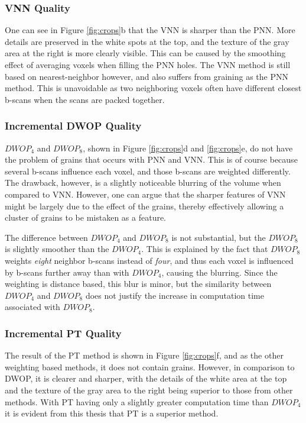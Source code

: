 	\subsubsection{VNN Quality}
	
		One can see in Figure \ref{fig:crops}b that the VNN is sharper than the PNN. More details are preserved in the white spots at the top, and the texture of the gray area at the right is more clearly visible. This can be caused by the smoothing effect of averaging voxels when filling the PNN holes. The VNN method is still based on nearest-neighbor however, and also suffers from graining as the PNN method. This is unavoidable as two neighboring voxels often have different closest b-scans when the scans are packed together.
	
	\subsubsection{Incremental DWOP Quality} %
	
		$DWOP_4$ and $DWOP_8$, shown in Figure \ref{fig:crops}d and \ref{fig:crops}e, do not have the problem of grains that occurs with PNN and VNN. This is of course because several b-scans influence each voxel, and those b-scans are weighted differently. The drawback, however, is a slightly noticeable blurring of the volume when compared to VNN. However, one can argue that the sharper features of VNN might be largely due to the effect of the grains, thereby effectively allowing a cluster of grains to be mistaken as a feature.
		
		The difference between $DWOP_4$ and $DWOP_8$ is not substantial, but the $DWOP_8$ is slightly smoother than the $DWOP_4$. This is explained by the fact that $DWOP_8$ weights \emph{eight} neighbor b-scans instead of \emph{four}, and thus each voxel is influenced by b-scans further away than with $DWOP_4$, causing the blurring. Since the weighting is distance based, this blur is minor, but the similarity between $DWOP_4$ and $DWOP_8$ does not justify the increase in computation time associated with $DWOP_8$.
	
	\subsubsection{Incremental PT Quality}
	
		The result of the PT method is shown in Figure \ref{fig:crops}f, and as the other weighting based methods, it does not contain grains. However, in comparison to DWOP, it is clearer and sharper, with the details of the white area at the top and the texture of the gray area to the right being superior to those from other methods. With PT having only a slightly greater computation time than $DWOP_4$ it is evident from this thesis that PT is a superior method.		
		

